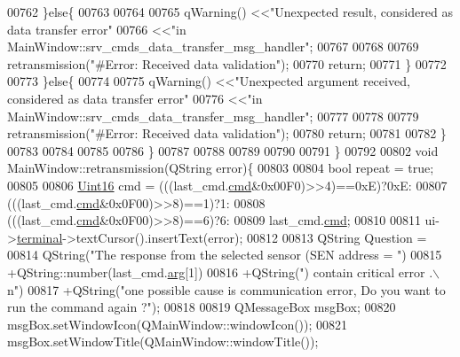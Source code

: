 \begin{DoxyCode}
{{{{{{{{{{{{{{{{{{{{00762                \}\textcolor{keywordflow}{else}\{
00763 
00764                    
00765                    qWarning() <<\textcolor{stringliteral}{"Unexpected result, considered as data transfer error"}
00766                               <<\textcolor{stringliteral}{"in MainWindow::srv\_cmds\_data\_transfer\_msg\_handler"};
00767                    
00768                    
00769                    retransmission(\textcolor{stringliteral}{"#Error: Received data  validation"});
00770                    \textcolor{keywordflow}{return};
00771                \}
00772 
00773            \}\textcolor{keywordflow}{else}\{
00774 
00775                qWarning() <<\textcolor{stringliteral}{"Unexpected argument received, considered as data transfer error"}
00776                           <<\textcolor{stringliteral}{"in MainWindow::srv\_cmds\_data\_transfer\_msg\_handler"};
00777                
00778                
00779                retransmission(\textcolor{stringliteral}{"#Error: Received data  validation"});
00780                \textcolor{keywordflow}{return};
00781 
00782            \}
00783 
00784 
00785 
00786          \}
00787 
00788 
00789     
00790 
00791 \}
00792 
00802 \textcolor{keywordtype}{void} MainWindow::retransmission(QString error)\{
00803 
00804     \textcolor{keywordtype}{bool} repeat = \textcolor{keyword}{true};
00805     
00806     \hyperlink{a00001_aae7407b021d43f7193a81a58cfb3e297}{Uint16} cmd = (((last\_cmd.\hyperlink{a00001_af20664dc9ca2b752c73d524edee0e07a}{cmd}&0x00F0)>>4)==0xE)?0xE:
00807                  (((last\_cmd.\hyperlink{a00001_af20664dc9ca2b752c73d524edee0e07a}{cmd}&0x0F00)>>8)==1)?1:
00808                  (((last\_cmd.\hyperlink{a00001_af20664dc9ca2b752c73d524edee0e07a}{cmd}&0x0F00)>>8)==6)?6:
00809                  last\_cmd.\hyperlink{a00001_af20664dc9ca2b752c73d524edee0e07a}{cmd};
00810     
00811     ui->\hyperlink{a00027_aae71c46ea4546df5994735dee573b2dd}{terminal}->textCursor().insertText(error);
00812 
00813     QString Question =
00814             QString(\textcolor{stringliteral}{"The response from the selected sensor (SEN address = "})
00815             +QString::number(last\_cmd.\hyperlink{a00001_a56e6c2d7315d0ae60a51e8b140c9cfe4}{arg}[1])
00816             +QString(\textcolor{stringliteral}{") contain critical error .\(\backslash\)n"})
00817             +QString(\textcolor{stringliteral}{"one possible cause is communication error, Do you want to run the command again ?"});
00818 
00819     QMessageBox msgBox;
00820     msgBox.setWindowIcon(QMainWindow::windowIcon());
00821     msgBox.setWindowTitle(QMainWindow::windowTitle());
}}}}}}}}}}}}}}}}}}}}
\end{DoxyCode}
